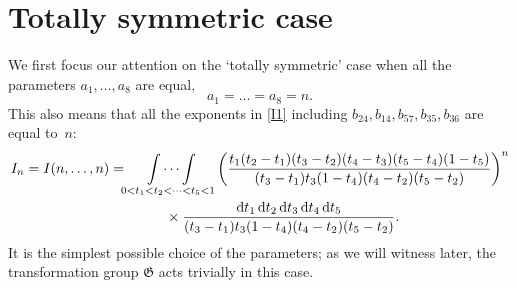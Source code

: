 \documentclass[12pt,reqno]{amsart}
\theoremstyle{remark}
\renewcommand{\d}{{\mathrm d}}
\newcommand\frG{\mathfrak G}
\begin{document}
\section{Totally symmetric case}
\label{sec2}

We first focus our attention on the `totally symmetric' case when all the parameters $a_1,\dots,a_8$ are equal,
\[
a_1=\dots=a_8=n.
\]
This also means that all the exponents in \eqref{I1} including $b_{24},b_{14},b_{57},b_{35},b_{36}$ are equal to~$n$:
\begin{align*}
I_n=I(n,\dots,n)
&=\idotsint\limits_{0<t_1<t_2<\dots<t_5<1}
\bigg(\frac{t_1(t_2 - t_1)(t_3 - t_2)(t_4 - t_3)(t_5 - t_4)(1 - t_5)}
{(t_3 - t_1)t_3(1 - t_4)(t_4 - t_2)(t_5 - t_2)}\bigg)^n
\\ &\qquad\qquad\times
\frac{\d t_1\,\d t_2\,\d t_3\,\d t_4\,\d t_5}{(t_3 - t_1)t_3(1 - t_4)(t_4 - t_2)(t_5 - t_2)}.
\end{align*}
It is the simplest possible choice of the parameters; as we will witness later, the transformation group $\frG$ acts trivially in this case.
\end{document}
